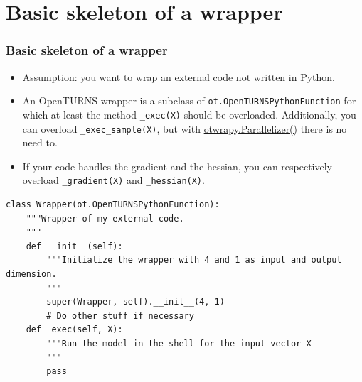\documentclass[10pt, aspectratio=169]{beamer}
\begin{document}
\section{Basic skeleton of a wrapper}
\label{sec-3}
\begin{frame}[fragile]
\frametitle{Basic skeleton of a wrapper}
\begin{itemize}
\item Assumption: you want to wrap an external code not written in Python.
\item An OpenTURNS wrapper is a subclass of \texttt{ot.OpenTURNSPythonFunction}
  for which at least the method \texttt{\_exec(X)} should be
  overloaded. Additionally, you can overload \texttt{\_exec\_sample(X)}, but
  with \href{http://openturns.github.io/otwrapy/master/_generated/otwrapy.Parallelizer.html}{otwrapy.Parallelizer()} there is no need to.
\item If your code handles the gradient and the hessian, you can
  respectively overload \texttt{\_gradient(X)} and \texttt{\_hessian(X)}.
\end{itemize}
\vfill
\begin{Verbatim}[xleftmargin=10mm]
class Wrapper(ot.OpenTURNSPythonFunction):
    """Wrapper of my external code.
    """
    def __init__(self):
        """Initialize the wrapper with 4 and 1 as input and output dimension.
        """
        super(Wrapper, self).__init__(4, 1)
        # Do other stuff if necessary
    def _exec(self, X):
        """Run the model in the shell for the input vector X
        """
        pass
\end{Verbatim}
\end{frame}
\end{document}
